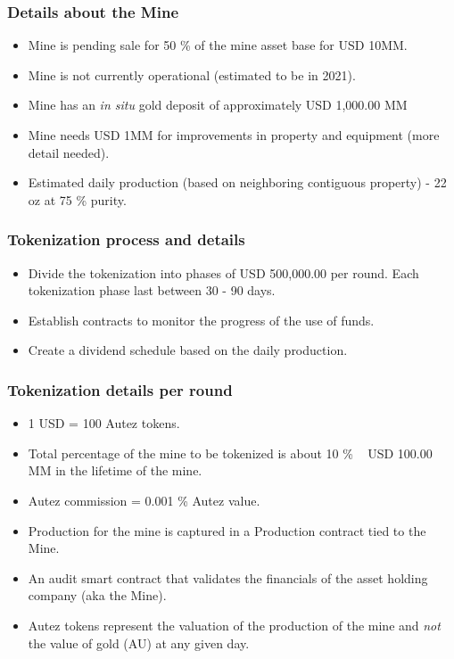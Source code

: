 \documentclass{beamer}
\begin{document}
\begin{frame}
\frametitle{Details about the Mine}
\begin{minipage}{\textwidth}
  \begin{itemize}
    \item  Mine is pending sale for 50 \% of the mine asset base for USD 10MM.
    \item  Mine is not currently operational (estimated to be in 2021).
    \item  Mine has an \textit{in situ} gold deposit of approximately USD 1,000.00 MM
    \item  Mine needs USD 1MM for improvements in property and equipment (more detail needed).
    \item  Estimated daily production (based on neighboring contiguous property) - 22 oz at 75 \% purity.
  \end{itemize}
\end{minipage}
\end{frame}

\begin{frame}
\frametitle{Tokenization process and details}
\begin{minipage}{\textwidth}
  \begin{itemize}
    \item  Divide the tokenization into phases of USD 500,000.00 per round. Each tokenization phase last between 30 - 90 days.
    \item  Establish contracts to monitor the progress of the use of funds.
    \item  Create a dividend schedule based on the daily production.
  \end{itemize}
  \end{minipage}
\end{frame}

\begin{frame}
\frametitle {Tokenization details per round}
\begin{minipage}{\textwidth}
  \begin{itemize}
    \item  1 USD = 100 Autez tokens.
    \item  Total percentage of the mine to be tokenized is about 10 \% ~ USD 100.00 MM in the lifetime of the mine.
    \item  Autez commission = 0.001 \% Autez value.
    \item  Production for the mine is captured in a Production contract tied to the Mine.
    \item  An audit smart contract that validates the financials of the asset holding company (aka the Mine).
    \item  Autez tokens represent the valuation of the production of the mine and \textit{not} the value of gold (AU) at any given day.
  \end{itemize}
  \end{minipage}
\end{frame}
\end{document}
